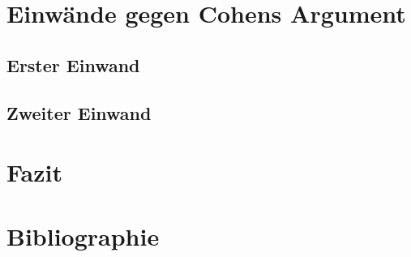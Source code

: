 \documentclass[ngerman,12pt, titlepage, smallheadings, nomath]{scrartcl}
\begin{document}
\vspace{-1.25em}

\section{Einwände gegen Cohens
Argument}\label{einwuxe4nde-gegen-cohens-argument}

\vspace{-1.25em}

\subsection{Erster Einwand}\label{erster-einwand}

\vspace{-1.25em}

\subsection{Zweiter Einwand}\label{zweiter-einwand}

\vspace{-1.25em}

\section{Fazit}\label{fazit}

\vspace{-1.25em}

\newpage

\section*{Bibliographie}\label{bibliographie}

\vspace{-1.25em}

\printbibliography
\end{document}
